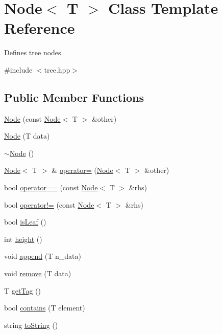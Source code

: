 \hypertarget{class_node}{\section{Node$<$ T $>$ Class Template Reference}
\label{class_node}
}


Defines tree nodes.  




{\ttfamily \#include $<$tree.\-hpp$>$}

\subsection*{Public Member Functions}
\begin{DoxyCompactItemize}
\item 
\hyperlink{class_node_ad70e3545b2df020088a0e26bec128632}{Node} (const \hyperlink{class_node}{Node}$<$ T $>$ \&other)
\item 
\hyperlink{class_node_a0692b16d246460bf94c18d49592facdd}{Node} (T data)
\item 
\hyperlink{class_node_ae923d0417581dd19784d55b901f0f7f0}{$\sim$\-Node} ()
\item 
\hyperlink{class_node}{Node}$<$ T $>$ \& \hyperlink{class_node_aa9d37ee4133ae9774c5cf2ca5a6da8af}{operator=} (\hyperlink{class_node}{Node}$<$ T $>$ \&other)
\item 
bool \hyperlink{class_node_ac6af63bbc9a1eef28615c5c0c5acb83c}{operator==} (const \hyperlink{class_node}{Node}$<$ T $>$ \&rhs)
\item 
bool \hyperlink{class_node_acb50abe854f383e0d624e85505697b4f}{operator!=} (const \hyperlink{class_node}{Node}$<$ T $>$ \&rhs)
\item 
bool \hyperlink{class_node_a26f91ff0b0d5ea8940c7fde220aca742}{is\-Leaf} ()
\item 
int \hyperlink{class_node_a0da7f6a2356d1e7f047f8bfda1edd8d8}{height} ()
\item 
void \hyperlink{class_node_a141b357c5d9a30cd9b3062337ef67edb}{append} (T n\-\_\-data)
\item 
void \hyperlink{class_node_a33901811ec542883fdfc68022dd59920}{remove} (T data)
\item 
T \hyperlink{class_node_a3b188b785e394924c11f2f68369c0cdf}{get\-Tag} ()
\item 
bool \hyperlink{class_node_ad319e53c90ce8bced6ffc42b67d8e759}{contains} (T element)
\item 
string \hyperlink{class_node_abb91d745a01f97fe51a35811e0d42801}{to\-String} ()

\end{DoxyCompactItemize}
